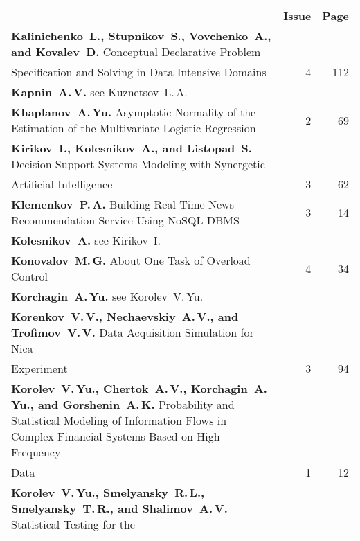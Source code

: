 {\tabcolsep=3pt
\begin{tabular}{p{397pt}rr}
&\textbf{Issue} & \textbf{Page}\\[6pt]
\textbf{Kalinichenko~L., Stupnikov~S., Vovchenko~A., and Kovalev~D.}
Conceptual Declarative Problem\linebreak
\vspace*{-12pt}\\
\hspace*{23pt}Specification and Solving in Data Intensive Domains\dotfill&4&112\\
\textbf{Kapnin~A.\,V.} see Kuznetsov~L.\,A.&&\\
\textbf{Khaplanov~A.\,Yu.}
Asymptotic Normality of the Estimation of the Multivariate Logistic
Regression\dotfill&2&69\\
\textbf{Kirikov~I., Kolesnikov~A., and Listopad~S.}
Decision Support Systems Modeling with Synergetic\linebreak
\vspace*{-12pt}\\
\hspace*{23pt}Artificial Intelligence\dotfill&3&62\\
\textbf{Klemenkov~P.\,A.}
Building Real-Time News Recommendation Service Using NoSQL DBMS&3&14\\
\textbf{Kolesnikov~A.} see Kirikov~I.&&\\
\textbf{Konovalov~M.\,G.}
About One Task of Overload Control\dotfill&4&34\\
\textbf{Korchagin~A.\,Yu.} see Korolev~V.\,Yu.&&\\
\textbf{Korenkov~V.\,V., Nechaevskiy~A.\,V., and Trofimov~V.\,V.}
Data Acquisition Simulation for Nica\linebreak
\vspace*{-12pt}\\
\hspace*{23pt}Experiment\dotfill&3&94\\
\hangindent=23pt\noindent\textbf{Korolev~V.\,Yu., Chertok~A.\,V., Korchagin~A.\,Yu., and
Gorshenin~A.\,K.}
Probability and Statistical Modeling of Information Flows in Complex Financial
Systems Based on High-Frequency\linebreak
\vspace*{-12pt}\\
\hspace*{23pt}Data\dotfill&1&12\\
\textbf{Korolev~V.\,Yu., Smelyansky~R.\,L., Smelyansky~T.\,R., and
Shalimov~A.\,V.}
Statistical Testing for the\linebreak

\end{tabular}}
